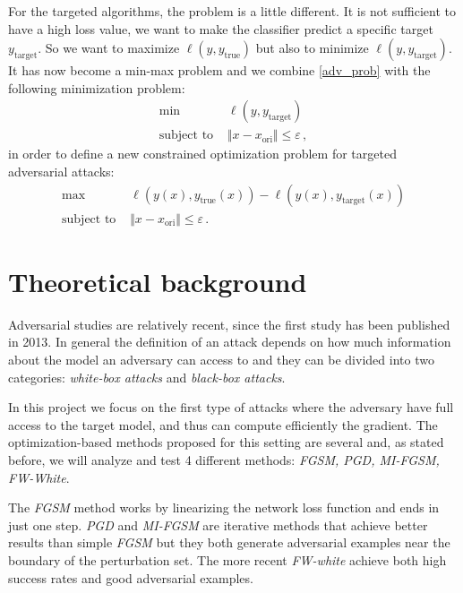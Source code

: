 \documentclass[10pt,twocolumn,letterpaper, english]{article}
\theoremstyle{definition}
\theoremstyle{plain}
\theoremstyle{plain}
\theoremstyle{plain}
\theoremstyle{plain}
\theoremstyle{remark}
\theoremstyle{remark}
\theoremstyle{definition}
\theoremstyle{definition}
\theoremstyle{definition}
\theoremstyle{definition}
\renewcommand{\epsilon}{\varepsilon}
\begin{document}
For the targeted algorithms, the problem is a little different. 
It is not sufficient to have a high loss value, we want to make the classifier predict a specific target $y_{\text{target}}$. 
So we want to maximize $\ell(y, y_{\text{true}})$ but also to minimize $\ell(y, y_{\text{target}})$. 
It has now become a min-max problem and we combine \ref{adv_prob} with the following minimization problem:
\begin{align*}
    \min \,\, &\ell(y, y_{\text{target}}) \\ 
    \text{subject to } & \Vert x - x_{\text{ori}} \Vert \le \epsilon \,,
\end{align*}
in order to define a new constrained optimization problem for targeted adversarial attacks: 
\begin{align}
    \max \,\, & \ell(y(x), y_{\text{true}}(x)) - \ell(y(x), y_{\text{target}}(x)) \label{targ_prob} \\
    \text{subject to } & \Vert x - x_{\text{ori}} \Vert \le \epsilon \nonumber \,.
\end{align}



\section{Theoretical background}
Adversarial studies are relatively recent, since the first study has been published in 2013. In general the definition of an attack depends on how much information about the model an adversary can access to and they can be divided into two categories: \textit{white-box attacks} and \textit{black-box attacks}.

In this project we focus on the first type of attacks where the adversary have full access to the target model, and thus can compute efficiently the gradient. The optimization-based methods proposed for this setting are several and, as stated before, we will analyze and test 4 different methods: \textit{FGSM, PGD, MI-FGSM, FW-White}.

The \textit{FGSM} method works by linearizing the network loss function and ends in just one step. \textit{PGD} and \textit{MI-FGSM} are iterative methods that achieve better results than simple \textit{FGSM} but they both generate adversarial examples near the boundary of the perturbation set. The more recent \textit{FW-white} achieve both high success rates and good adversarial examples.
\end{document}
